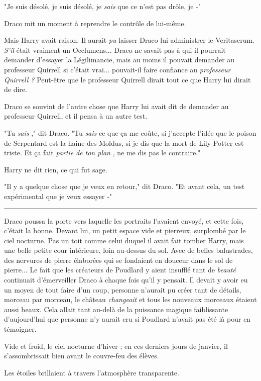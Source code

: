 "Je suis désolé, je suis désolé, je \emph{sais}  que ce n'est pas drôle, je -"

Draco mit un moment à reprendre le contrôle de lui-même.

Mais Harry avait raison. Il aurait \emph{pu}  laisser Draco lui administrer le Veritaserum. \emph{S'il}  était vraiment un Occlumens... Draco ne savait pas à qui il pourrait demander d'essayer la Légilimancie, mais au moins il pouvait demander au professeur Quirrell si c'était vrai... pouvait-il faire confiance au \emph{professeur Quirrell ?}  Peut-être que le professeur Quirrell dirait tout ce que Harry lui dirait de dire.

Draco se souvint de l'autre chose que Harry lui avait dit de demander au professeur Quirrell, et il pensa à un autre test.

"Tu \emph{sais} ," dit Draco. "Tu \emph{sais}  ce que ça me coûte, si j'accepte l'idée que le poison de Serpentard est la haine des Moldus, si je dis que la mort de Lily Potter est triste. Et ça fait \emph{partie}  \emph{de ton plan} , ne me dis pas le contraire."

Harry ne dit rien, ce qui fut sage.

"Il y a quelque chose que je veux en retour," dit Draco. "Et avant cela, un test expérimental que je veux essayer -"
\par\noindent\rule{\textwidth}{0.4pt}
Draco poussa la porte vers laquelle les portraits l'avaient envoyé, et cette fois, c'était la bonne. Devant lui, un petit espace vide et pierreux, surplombé par le ciel nocturne. Pas un toit comme celui duquel il avait fait tomber Harry, mais une belle petite cour intérieure, loin au-dessus du sol. Avec de belles balustrades, des nervures de pierre élaborées qui se fondaient en douceur dans le sol de pierre... Le fait que les créateurs de Poudlard y aient insufflé tant de \emph{beauté}  continuait d'émerveiller Draco à chaque fois qu'il y pensait. Il devait y avoir eu un moyen de tout faire d'un coup, personne n'aurait pu créer tant de détails, morceau par morceau, le château \emph{changeait}  et tous les nouveaux morceaux étaient aussi beaux. Cela allait tant au-delà de la puissance magique faiblissante d'aujourd'hui que personne n'y aurait cru si Poudlard n'avait pas été là pour en témoigner.

Vide et froid, le ciel nocturne d'hiver ; en ces derniers jours de janvier, il s'assombrissait bien avant le couvre-feu des élèves.

Les étoiles brillaient à travers l'atmosphère transparente.

